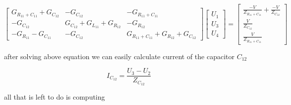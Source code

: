 \documentclass[notitlepage, a4paper, 11pt]{article}
\begin{document}
	\begin{center}
		\begin{equation}
			\begin{bmatrix}
				G_{R_{11}+C_{11}} + G_{C_{12}} & -G_{C_{12}} & -G_{R_{11}+C_{11}}\\[6pt]
				-G_{C_{12}} & G_{C_{12}} + G_{L_{11}} + G_{R_{12}} & -G_{R_{12}}\\[6pt]
				-G_{R_{11}}-G_{C_{11}} & -G_{C_{12}} & G_{R_{11}+C_{11}} + G_{R_{12}} + G_{C_{12}}
			\end{bmatrix}
			\begin{bmatrix}
				U_1\\[6pt]
				U_3\\[6pt]
				U_4
			\end{bmatrix}
			=
			\begin{bmatrix}
				\frac{-V}{Z_{R_{11}+C_{11}}}+\frac{-V}{Z_{C_12}}\\[6pt]
				\frac{V}{Z_{C_12}}\\[6pt]
				\frac{V}{Z_{R_{11}+C_{11}}}
			\end{bmatrix}
		\end{equation}
	\end{center}
	
	after solving above equation we can easily calculate current of the capacitor $C_{12}$
	
	\begin{equation}
		I_{C_{12}} = \frac{U_3 - U_2}{Z_{C_{12}}}
	\end{equation}

	all that is left to do is computing	
\end{document}
